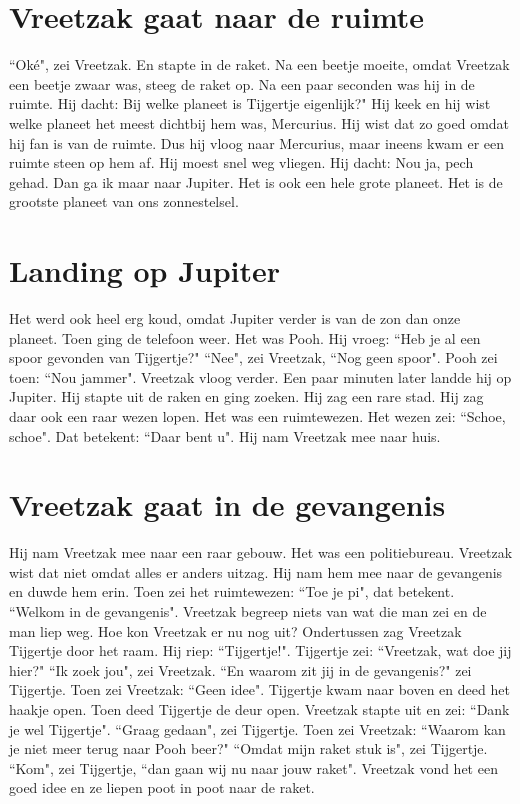 \documentclass{article}
\begin{document}
\section{Vreetzak gaat naar de ruimte}

``Oké", zei Vreetzak. En stapte in de raket. Na een beetje moeite, omdat Vreetzak een beetje zwaar was, steeg de raket op. Na een paar seconden was hij in de ruimte. Hij dacht: Bij welke planeet is Tijgertje eigenlijk?" Hij keek en hij wist welke planeet het meest dichtbij hem was, Mercurius. Hij wist dat zo goed omdat hij fan is van de ruimte. Dus hij vloog naar Mercurius, maar ineens kwam er een ruimte steen op hem af. Hij moest snel weg vliegen. Hij dacht: Nou ja, pech gehad. Dan ga ik maar naar Jupiter. Het is ook een hele grote planeet. Het is de grootste planeet van ons zonnestelsel.

\section{Landing op Jupiter}

Het werd ook heel erg koud, omdat Jupiter verder is van de zon dan onze planeet. Toen ging de telefoon weer. Het was Pooh. Hij vroeg: ``Heb je al een spoor gevonden van Tijgertje?" ``Nee", zei Vreetzak, ``Nog geen spoor". Pooh zei toen: ``Nou jammer". Vreetzak vloog verder. Een paar minuten later landde hij op Jupiter. Hij stapte uit de raken en ging zoeken. Hij zag een rare stad. Hij zag daar ook een raar wezen lopen. Het was een ruimtewezen. Het wezen zei: ``Schoe, schoe". Dat betekent: ``Daar bent u". Hij nam Vreetzak mee naar huis.

\section{Vreetzak gaat in de gevangenis}

Hij nam Vreetzak mee naar een raar gebouw. Het was een politiebureau. Vreetzak wist dat niet omdat alles er anders uitzag. Hij nam hem mee naar de gevangenis en duwde hem erin. Toen zei het ruimtewezen: ``Toe je pi", dat betekent. ``Welkom in de gevangenis". Vreetzak begreep niets van wat die man zei en de man liep weg. Hoe kon Vreetzak er nu nog uit? Ondertussen zag Vreetzak Tijgertje door het raam. Hij riep: ``Tijgertje!". Tijgertje zei: ``Vreetzak, wat doe jij hier?" ``Ik zoek jou", zei Vreetzak. ``En waarom zit jij in de gevangenis?" zei Tijgertje. Toen zei Vreetzak: ``Geen idee". Tijgertje kwam naar boven en deed het haakje open. Toen deed Tijgertje de deur open. Vreetzak stapte uit en zei: ``Dank je wel Tijgertje". ``Graag gedaan", zei Tijgertje. Toen zei Vreetzak: ``Waarom kan je niet meer terug naar Pooh beer?" ``Omdat mijn raket stuk is", zei Tijgertje. ``Kom", zei Tijgertje, ``dan gaan wij nu naar jouw raket". Vreetzak vond het een goed idee en ze liepen poot in poot naar de raket.
\end{document}

